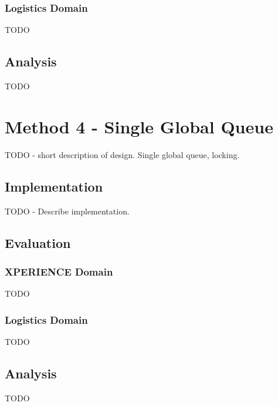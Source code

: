 \documentclass[12pt,twoside,abbrevs,msc,ai,notimes,logo,sansheadings]{infthesis}
\begin{document}
  \subsection{Logistics Domain}
  TODO
  \section{Analysis}
  TODO
  \chapter {Method 4 - Single Global Queue}
  TODO - short description of design. Single global queue, locking.
  \section {Implementation}
  TODO - Describe implementation.
  \section{Evaluation}
  \subsection{XPERIENCE Domain}
  TODO
  \subsection{Logistics Domain}
  TODO
  \section{Analysis}
  TODO
  
   
  
  
  
  

  \appendix


  {}
  
\end{document}
